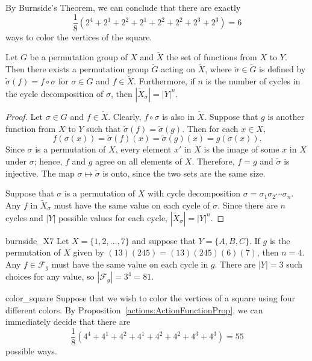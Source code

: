 By Burnside's Theorem, we can conclude that there are exactly
\[
\frac{1}{8} ( 2^4 + 2^1 + 2^2 + 2^1  + 2^2 + 2^2 +2^3 + 2^3)
= 6
\]
ways to color the vertices of the square.
 
 
\begin{proposition}\label{actions:ActionFunctionProp}
Let $G$ be a permutation group of $X$ and $\widetilde{X}$ the set of
functions from $X$ to $Y$. Then there exists a permutation group 
$\widetilde{G}$ acting on $\widetilde{X}$, where $\widetilde{\sigma} 
\in \widetilde{G}$ is defined by $\widetilde{\sigma}(f) = f \circ 
\sigma$ for $\sigma \in G$ and $f \in \widetilde{X}$. Furthermore, 
if $n$ is the number of cycles in the cycle decomposition 
of $\sigma$, then $|\widetilde{X}_{\sigma}| = |Y|^n$. 
\end{proposition}
 
 
\begin{proof}
Let $\sigma \in G$ and $f \in  \widetilde{X}$. Clearly, $f \circ
\sigma$ is also in $\widetilde{X}$. Suppose that $g$ is another
function from $X$ to $Y$ such that $\widetilde{\sigma}(f) =
\widetilde{\sigma}(g)$. Then for each $x \in X$,
\[
f( \sigma(x ))
= \widetilde{\sigma}(f)(x)
= \widetilde{\sigma}(g)(x)
= g( \sigma(x )).
\]
Since $\sigma$ is a permutation of $X$, every element $x'$ in $X$ is
the image of some $x$ in $X$ under $\sigma$; hence, $f$ and $g$ agree
on all elements of $X$. Therefore, $f=g$ and $\widetilde{\sigma}$ is
injective.  The map $\sigma \mapsto \widetilde{\sigma}$ is onto, since
the two sets are the same size.
 
 
Suppose that $\sigma$ is a permutation of $X$ with cycle decomposition
$\sigma = \sigma_1 \sigma_2 \cdots \sigma_n$. Any $f$ in
${\widetilde{X}}_{\sigma}$ must have the same value on each cycle of
$\sigma$. Since there are $n$ cycles and $|Y|$ possible values for
each cycle, $|{\widetilde{X}}_{\sigma}| = |Y|^n$.
\mbox{\hspace{1in}}
\end{proof}
 
 
\begin{example}{burnside_X7}
Let $X = \{1, 2, \ldots, 7\}$ and suppose that $Y = \{ A, B, C \}$. If
$g$ is the permutation of $X$ given by $(1 3)(2 4 5) = (1 3)(2 4
5)(6)(7)$, then $n = 4$. Any $f \in {\mathcal F}_g$ must have the same
value on each cycle in $g$. There are $|Y|=3$ such choices for any
value, so $|{\mathcal F}_g|  = 3^4 = 81$.
\end{example}
 
 
\begin{example}{color_square}
Suppose that we wish to color the vertices of a square using four
different colors. By Proposition~\ref{actions:ActionFunctionProp}, we can immediately
decide that there are 
\[
\frac{1}{8} (4^4 + 4^1 + 4^2 + 4^1 + 4^2 + 4^ 2 + 4^3 + 4^3)
=55
\]
possible ways.
\end{example}
 
